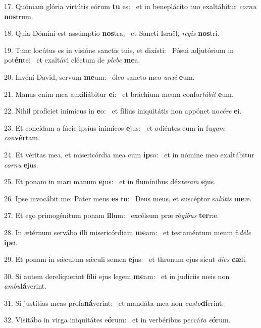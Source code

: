 17. Quóniam glória virtútis eórum \textbf{tu} es: \ast\  et in beneplácito tuo exaltábitur \textit{cor}\textit{nu} \textbf{nos}trum.\

18. Quia Dómini est assúmptio \textbf{nos}tra, \ast\  et Sancti Israël, \textit{re}\textit{gis} \textbf{nos}tri.\

19. Tunc locútus es in visióne sanctis tuis, et dixísti: \dag\  Pósui adjutórium in pot\textbf{én}te: \ast\  et exaltávi eléctum de \textit{ple}\textit{be} \textbf{me}a.\

20. Invéni David, servum \textbf{me}um: \ast\  óleo sancto meo \textit{un}\textit{xi} \textbf{e}um.\

21. Manus enim mea auxiliábitur \textbf{e}i: \ast\  et bráchium meum confor\textit{tá}\textit{bit} \textbf{e}um.\

22. Nihil profíciet inimícus in \textbf{e}o: \ast\  et fílius iniquitátis non appónet no\textit{cé}\textit{re} \textbf{e}i.\

23. Et concídam a fácie ipsíus inimícos \textbf{e}jus: \ast\  et odiéntes eum in fu\textit{gam} \textit{con}\textbf{vér}tam.\

24. Et véritas mea, et misericórdia mea cum \textbf{ip}so: \ast\  et in nómine meo exaltábitur \textit{cor}\textit{nu} \textbf{e}jus.\

25. Et ponam in mari manum \textbf{e}jus: \ast\  et in flumínibus déx\textit{te}\textit{ram} \textbf{e}jus.\

26. Ipse invocábit me: Pater meus \textbf{es} tu: \ast\  Deus meus, et suscéptor sa\textit{lú}\textit{tis} \textbf{me}æ.\

27. Et ego primogénitum ponam \textbf{il}lum: \ast\  excélsum præ ré\textit{gi}\textit{bus} \textbf{ter}ræ.\

28. In ætérnum servábo illi misericórdiam \textbf{me}am: \ast\  et testaméntum meum fi\textit{dé}\textit{le} \textbf{ip}si.\

29. Et ponam in sǽculum sǽculi semen \textbf{e}jus: \ast\  et thronum ejus sicut \textit{di}\textit{es} \textbf{cæ}li.\

30. Si autem derelíquerint fílii ejus legem \textbf{me}am: \ast\  et in judíciis meis non \textit{am}\textit{bu}\textbf{lá}verint.\

31. Si justítias meas profa\textbf{ná}verint: \ast\  et mandáta mea non \textit{cus}\textit{to}\textbf{dí}erint:\

32. Visitábo in virga iniquitátes e\textbf{ó}rum: \ast\  et in verbéribus peccá\textit{ta} \textit{e}\textbf{ó}rum.\

